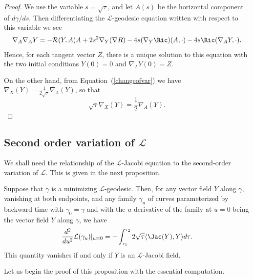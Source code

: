 \begin{proof}
\sketch
{}
We use the variable $s=\sqrt{\tau}$, and let $A(s)$ be the
horizontal component of $d\gamma/ds$. Then differentiating the
${\mathcal L}$-geodesic equation written with respect to this
variable we see
$$\nabla_A\nabla_AY=-{\mathcal R}(Y,A)A+2s^2\nabla_Y(\nabla R)-4s(\nabla_Y\Ric)(A,\cdot)
-4s\Ric(\nabla_AY,\cdot).$$ Hence, for each tangent vector $Z$,
there is a unique solution to this equation with the two initial
conditions $Y(0)=0$ and $\nabla_AY(0)=Z$.

On the other hand, from Equation~(\ref{changeofvar}) we have
$\nabla_X(Y)=\frac{1}{2\sqrt{\tau}}\nabla_A(Y)$, so that
$$\sqrt{\tau}\nabla_X(Y)=\frac{1}{2}\nabla_A(Y).$$
\end{proof}


\subsection{Second order variation of ${\mathcal
L}$} We shall need the relationship of the ${\mathcal L}$-Jacobi
equation to the second-order variation of ${\mathcal L}$. This is
given in the next proposition.




\begin{proposition}\label{prop:l-length-second-variation}
\label{2ndvarj}
Suppose that $\gamma$ is a minimizing ${\mathcal L}$-geodesic. Then,
for any vector field $Y$ along $\gamma$, vanishing at both
endpoints, and any family $\gamma_u$ of curves parameterized by
backward time with $\gamma_0=\gamma$ and with the $u$-derivative of
the family at $u=0$ being the vector field $Y$ along $\gamma$, we
have
$$\frac{d^2}{du^2}{\mathcal L}(\gamma_u)|_{u=0}=-\int_{\tau_1}^{\tau_2}2\sqrt{\tau}
\langle \Jac(Y),Y\rangle d\tau.$$ This quantity vanishes if and
only if $Y$ is an ${\mathcal L}$-Jacobi field.
\end{proposition}


Let us begin the proof of this proposition with the essential computation.


